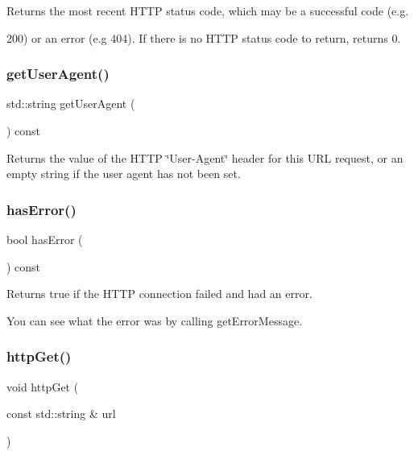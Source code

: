 Returns the most recent H\+T\+TP status code, which may be a successful code (e.\+g. 

200) or an error (e.\+g 404). If there is no H\+T\+TP status code to return, returns 0. \mbox{\label{classGDownloader_a479f109234aad1c792be804bf6320c62}} 
\subsubsection{\texorpdfstring{get\+User\+Agent()}{getUserAgent()}}
{\footnotesize\ttfamily std\+::string get\+User\+Agent (\begin{DoxyParamCaption}{ }\end{DoxyParamCaption}) const}



Returns the value of the H\+T\+TP \char`\"{}\+User-\/\+Agent\char`\"{} header for this U\+RL request, or an empty string if the user agent has not been set. 

\mbox{\label{classGDownloader_a81dd125e253592aaef5fea33dfc50c42}} 
\subsubsection{\texorpdfstring{has\+Error()}{hasError()}}
{\footnotesize\ttfamily bool has\+Error (\begin{DoxyParamCaption}{ }\end{DoxyParamCaption}) const}



Returns true if the H\+T\+TP connection failed and had an error. 

You can see what the error was by calling get\+Error\+Message. \mbox{\label{classGDownloader_a4bafb98a98bc6edc2403a3734c985618}} 
\subsubsection{\texorpdfstring{http\+Get()}{httpGet()}}
{\footnotesize\ttfamily void http\+Get (\begin{DoxyParamCaption}\item[{const std\+::string \&}]{url }\end{DoxyParamCaption})}



